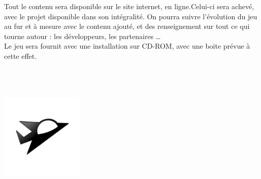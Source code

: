\documentclass[10pt, titlepage]{report}
\begin{document}
Tout le contenu sera disponible sur le site internet, en ligne.Celui-ci sera achevé, avec le projet disponible dans son intégralité. On pourra suivre l'évolution du jeu au fur et à mesure avec le contenu ajouté, et des renseignement sur tout ce qui tourne autour : les développeurs, les partenaires \dots \\

Le jeu sera fournit avec une installation sur CD-ROM, avec une boite prévue à cette effet. \\ \\ \\ \\

\begin{center}
\includegraphics[height=4cm, width=4cm]{vaisseux_petit.png}
\end{center}
\end{document}
